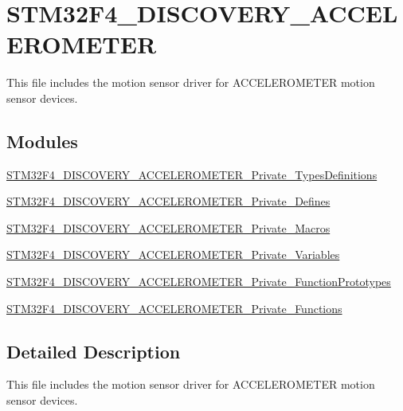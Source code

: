 \hypertarget{group__STM32F4__DISCOVERY__ACCELEROMETER}{\section{S\-T\-M32\-F4\-\_\-\-D\-I\-S\-C\-O\-V\-E\-R\-Y\-\_\-\-A\-C\-C\-E\-L\-E\-R\-O\-M\-E\-T\-E\-R}
\label{group__STM32F4__DISCOVERY__ACCELEROMETER}
}


This file includes the motion sensor driver for A\-C\-C\-E\-L\-E\-R\-O\-M\-E\-T\-E\-R motion sensor devices.  


\subsection*{Modules}
\begin{DoxyCompactItemize}
\item 
\hyperlink{group__STM32F4__DISCOVERY__ACCELEROMETER__Private__TypesDefinitions}{S\-T\-M32\-F4\-\_\-\-D\-I\-S\-C\-O\-V\-E\-R\-Y\-\_\-\-A\-C\-C\-E\-L\-E\-R\-O\-M\-E\-T\-E\-R\-\_\-\-Private\-\_\-\-Types\-Definitions}
\item 
\hyperlink{group__STM32F4__DISCOVERY__ACCELEROMETER__Private__Defines}{S\-T\-M32\-F4\-\_\-\-D\-I\-S\-C\-O\-V\-E\-R\-Y\-\_\-\-A\-C\-C\-E\-L\-E\-R\-O\-M\-E\-T\-E\-R\-\_\-\-Private\-\_\-\-Defines}
\item 
\hyperlink{group__STM32F4__DISCOVERY__ACCELEROMETER__Private__Macros}{S\-T\-M32\-F4\-\_\-\-D\-I\-S\-C\-O\-V\-E\-R\-Y\-\_\-\-A\-C\-C\-E\-L\-E\-R\-O\-M\-E\-T\-E\-R\-\_\-\-Private\-\_\-\-Macros}
\item 
\hyperlink{group__STM32F4__DISCOVERY__ACCELEROMETER__Private__Variables}{S\-T\-M32\-F4\-\_\-\-D\-I\-S\-C\-O\-V\-E\-R\-Y\-\_\-\-A\-C\-C\-E\-L\-E\-R\-O\-M\-E\-T\-E\-R\-\_\-\-Private\-\_\-\-Variables}
\item 
\hyperlink{group__STM32F4__DISCOVERY__ACCELEROMETER__Private__FunctionPrototypes}{S\-T\-M32\-F4\-\_\-\-D\-I\-S\-C\-O\-V\-E\-R\-Y\-\_\-\-A\-C\-C\-E\-L\-E\-R\-O\-M\-E\-T\-E\-R\-\_\-\-Private\-\_\-\-Function\-Prototypes}
\item 
\hyperlink{group__STM32F4__DISCOVERY__ACCELEROMETER__Private__Functions}{S\-T\-M32\-F4\-\_\-\-D\-I\-S\-C\-O\-V\-E\-R\-Y\-\_\-\-A\-C\-C\-E\-L\-E\-R\-O\-M\-E\-T\-E\-R\-\_\-\-Private\-\_\-\-Functions}
\end{DoxyCompactItemize}


\subsection{Detailed Description}
This file includes the motion sensor driver for A\-C\-C\-E\-L\-E\-R\-O\-M\-E\-T\-E\-R motion sensor devices. 